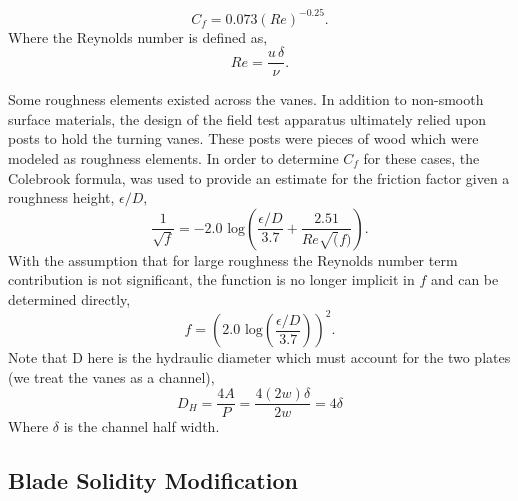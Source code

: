 %
%
%
\begin{equation}
 C_f = 0.073 (Re)^{-0.25}. 
\end{equation}
Where the Reynolds number is defined as, 
\begin{equation}
 Re = \frac{u\, \delta}{\nu}.
\end{equation}

Some roughness elements existed across the vanes. In addition to
non-smooth surface materials, the design of the field test apparatus
ultimately relied upon posts to hold the turning vanes. These posts were
pieces of wood which were modeled as roughness elements. In order to
determine $C_f$ for these cases, the Colebrook formula\cite{Colebrook367},
was used to provide an estimate for the friction factor given a
roughness height, $\epsilon/D$,  
\begin{equation}
 \frac{1}{\sqrt{f}} = -2.0 \text{ log}\left(\frac{\epsilon/D}{3.7} + \frac{2.51}{Re\sqrt(f)}\right).
\end{equation}
 With the assumption that for large roughness the Reynolds number term
 contribution is not significant, the function is no longer implicit in
 $f$ and can be determined directly, 
\begin{equation}
 f = \left(2.0 \text{ log}\left(\frac{\epsilon/D}{3.7}\right)\right)^2. 
\end{equation}
Note that D here is the hydraulic diameter which must account for the
two plates (we treat the vanes as a channel),
\begin{equation}
D_H = \frac{4 A}{P} = \frac{4 (2w)\delta}{2w} = 4 \delta
\end{equation}
Where $\delta$ is the channel half width.



\subsection{Blade Solidity Modification}
\label{sec:solidity}
%
%

